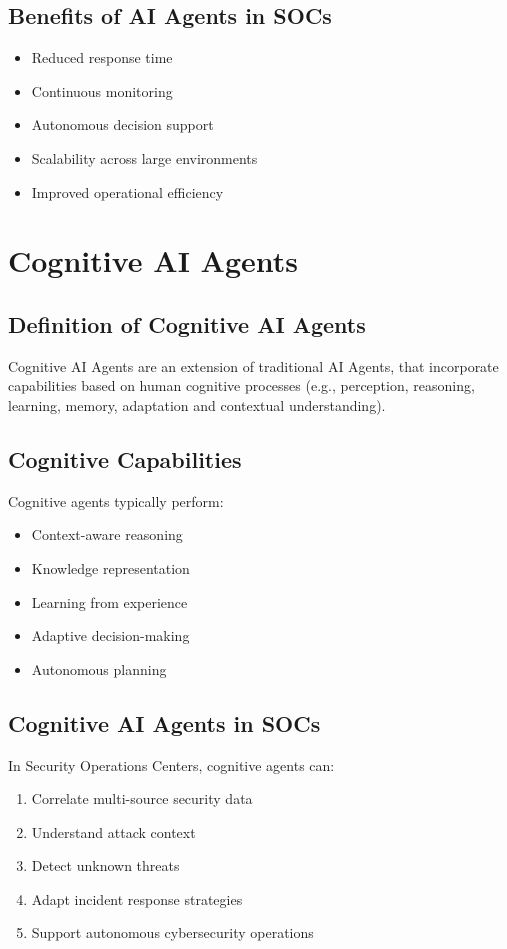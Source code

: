 \documentclass[12pt,a4paper]{report}
\begin{document}
\subsection{Benefits of AI Agents in SOCs}
\begin{itemize}
    \item Reduced response time
    \item Continuous monitoring
    \item Autonomous decision support
    \item Scalability across large environments
    \item Improved operational efficiency
\end{itemize}

\section{Cognitive AI Agents}
\label{sec:cognitive_agents}

\subsection{Definition of Cognitive AI Agents}
Cognitive AI Agents are an extension of traditional AI Agents, that incorporate capabilities based on human cognitive processes (e.g., perception, reasoning, learning, memory, adaptation and contextual understanding).

\subsection{Cognitive Capabilities}
Cognitive agents typically perform:
\begin{itemize}
    \item Context-aware reasoning
    \item Knowledge representation
    \item Learning from experience
    \item Adaptive decision-making
    \item Autonomous planning
\end{itemize}

\subsection{Cognitive AI Agents in SOCs}
In Security Operations Centers, cognitive agents can:
\begin{enumerate}[label=\arabic*.]
    \item Correlate multi-source security data
    \item Understand attack context
    \item Detect unknown threats
    \item Adapt incident response strategies
    \item Support autonomous cybersecurity operations
\end{enumerate}
\end{document}
